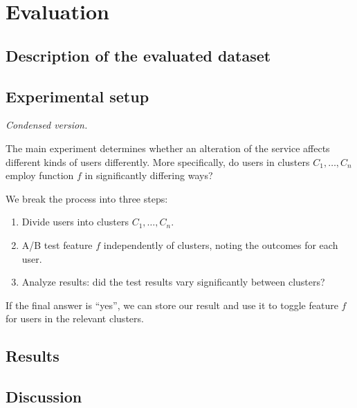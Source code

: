 \chapter{Evaluation}

\label{Chapter4}


\section{Description of the evaluated dataset} %
\label{sec:description_of_the_evaluated_dataset}


\section{Experimental setup} %
\label{sec:experimental_setup}

\emph{Condensed version.}

The main experiment determines whether an alteration of the service affects different kinds of users differently.
More specifically, do users in clusters $C_1, \ldots, C_n$ employ function $f$ in significantly differing ways?

We break the process into three steps:

\begin{enumerate}
  \item Divide users into clusters $C_1, \ldots, C_n$.
  \item A/B test feature $f$ independently of clusters, noting the outcomes for each user.
  \item Analyze results: did the test results vary significantly between clusters?
\end{enumerate}

If the final answer is ``yes'', we can store our result and use it to toggle feature $f$ for users in the relevant clusters.


\section{Results} %
\label{sec:results}


\section{Discussion} %
\label{sec:discussion}

